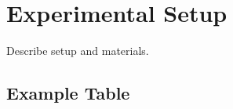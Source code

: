 \section{Experimental Setup}
Describe setup and materials.\cite{EinsteinCoefficientsSpringerLink}

\subsection{Example Table}
